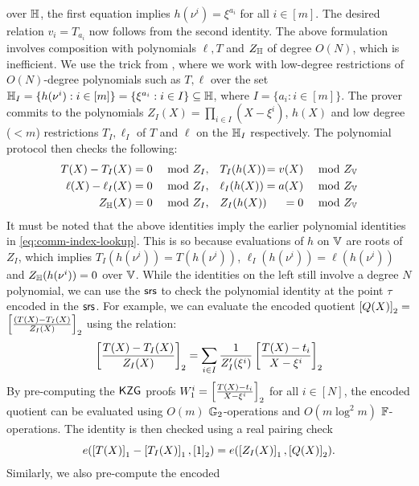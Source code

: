over $\mathbb{H}$, the first equation implies $h(\nu^i)=\xi^{a_i}$ for all $i\in [m]$. The desired relation $v_i=T_{a_i}$ now follows from the second identity.
The above formulation involves composition with polynomials $\ell,T$ and $Z_\mathbb{H}$ of degree $O(N)$, which is inefficient. We use the trick from
\cite{EPRINT:PosKat22}, where we work with low-degree restrictions of $O(N)$-degree polynomials such as $T, \ell$ over the set
$\mathbb{H}_I=\{{h(\nu^i)}: i\in [m]\}=\{\xi^{a_i}:i\in I\}\subseteq \mathbb{H}$, where $I=\{a_i: i\in [m]\}$. The prover
commits to the polynomials $Z_I(X)=\prod_{i\in I}(X-\xi^i)$, $h(X)$ and low degree ($<m$) restrictions $T_I, \ell_I$ of $T$ and $\ell$
on the $\mathbb{H}_I$ respectively. The polynomial protocol then checks the following:
\begin{equation}
    \begin{alignedat}{3}
        T(X) - T_I(X) &= 0 \quad \text{ mod } Z_I ,&\quad& T_I(h(X)) &= v(X) \quad \text{ mod } Z_{\mathbb{V}} \\
        \ell(X) - \ell_I(X) &= 0 \quad \text{ mod } Z_I ,&\quad& \ell_I(h(X)) &= a(X) \quad \text{ mod } Z_{\mathbb{V}} \\
        Z_{\mathbb{H}}(X) &= 0 \quad \text{ mod } Z_I ,&\quad& Z_I(h(X)) &= 0 \quad \text{ mod } Z_{\mathbb{V}}
    \end{alignedat}
    \label{eq:poly-comm-index}
\end{equation}
It must be noted that the above identities imply the earlier polynomial identities in \eqref{eq:comm-index-lookup}. This is so because evaluations
of $h$ on $\mathbb{V}$ are roots of $Z_I$, which implies $T_I(h(\nu^i))=T(h(\nu^i))$, $\ell_I(h(\nu^i))=\ell(h(\nu^i))$ and $Z_\mathbb{H}(h(\nu^i))=0$ over $\mathbb{V}$.
While the identities on the left still involve a degree $N$ polynomial, we can use the $\mathsf{srs}$ to check the polynomial
identity at the point $\tau$ encoded in the $\mathsf{srs}$. For example, we can evaluate the encoded quotient $\left[{Q(X)}\right]_2 =$
$\left[{\frac{(T(X) - T_I(X)}{Z_I(X)}}\right]_2$ using the relation:
\begin{equation*}
    \left[{\frac{T(X)-T_I(X)}{Z_I(X)}}\right]_2 = \sum_{i\in I}\frac{1}{Z_I'(\xi^i)}\left[{\frac{T(X)-t_i}{X-\xi^i}}\right]_2
\end{equation*}
By pre-computing the $\mathsf{KZG}$ proofs $W_1^i=\left[{\frac{T(X)-t_i}{X-\xi^i}}\right]_2$ for all $i\in [N]$, the encoded quotient can be
evaluated using $O(m)$ $\mathbb{G}_2$-operations and $O(m\log^2 m)$ $\mathbb{F}$-operations.
The identity is then checked using a real pairing check
$$e(\left[{T(X)}\right]_1-\left[{T_I(X)}\right]_1,\left[{1}\right]_2)=e(\left[{Z_I(X)}\right]_1,\left[{Q(X)}\right]_2).$$
Similarly, we also pre-compute the encoded
